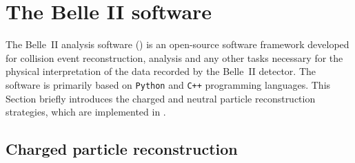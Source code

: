 \section{The Belle II software}\label{sec:belle2_software}

The Belle~II analysis software (\basftwo) \cite{Kuhr:2018lps} is an open-source software framework developed for collision event reconstruction, analysis 
and any other tasks necessary for the physical interpretation of the data recorded by the Belle~II detector.
The software is primarily based on \texttt{Python} and \texttt{C++} programming languages.
This Section briefly introduces the charged and neutral particle reconstruction strategies, which are implemented in \basftwo.

\subsection{Charged particle reconstruction}\label{sec:tracking}

